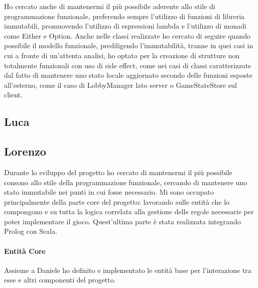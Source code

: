 Ho cercato anche di mantenermi il più possibile aderente allo stile di programmazione funzionale, preferendo sempre l’utilizzo di funzioni di libreria immutabili, promuovendo l’utilizzo di espressioni lambda e l’utilizzo di monadi come Either e Option.
Anche nelle classi realizzate ho cercato di seguire quando possibile il modello funzionale, prediligendo l’immutabilità, tranne in quei casi in cui a fronte di un’attenta analisi, ho optato per la creazione di strutture non totalmente funzionali con uso di side effect, come nei casi di classi caratterizzate dal fatto di mantenere uno stato locale aggiornato secondo delle funzioni esposte all’esterno, come il caso di LobbyManager lato server o GameStateStore sul client.

\subsection{Luca}

\subsection{Lorenzo}
Durante lo sviluppo del progetto ho cercato di mantenermi il più possibile consono allo stile della programmazione funzionale, cercando di mantenere uno stato immutabile nei punti in cui fosse necessario.
Mi sono occupato principalmente della parte core del progetto: lavorando sulle entità che lo compongono e su tutta la logica correlata alla gestione delle regole necessarie per poter implementare il gioco.
Quest’ultima parte è stata realizzata integrando Prolog con Scala.

\paragraph{Entità Core}
Assieme a Daniele ho definito e implementato le entità base per l’interazione tra esse e altri componenti del progetto.

